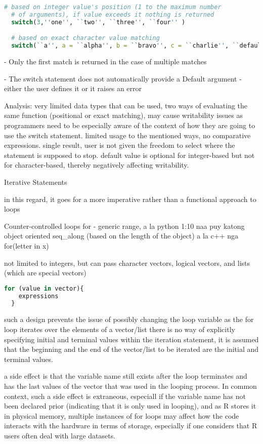 \documentclass[12pt]{article}
\begin{document}
\begin{lstlisting}[language=R]
  # based on integer value's position (1 to the maximum number
  # of arguments), if value exceeds it nothing is returned
  switch(3,''one'', ``two'', ``three'', ``four'' )

  # based on exact character value matching
  switch(``a'', a = ``alpha'', b = ``bravo'', c = ``charlie'', ``default value'')
\end{lstlisting}

- Only the first match is returned in the case of multiple matches

- The switch statement does not automatically provide a Default argument - either the user defines it or it raises an error

Analysis: very limited data types that can be used, two ways of evaluating the same function (positional or exact matching), may cause writability issues as programmers need to be especially aware of the context of how they are going to use the switch statement. limited usage to the mentioned ways, no comparative expressions. single result, user is not given the freedom to select where the statement is supposed to stop. default value is optional for integer-based but not for character-based, thereby negatively affecting writability.


Iterative Statements

in this regard, it goes for a more imperative rather than a functional approach to loops

Counter-controlled loops
for - generic
range, a la python 1:10
naa puy katong object oriented seq\_along (based on the length of the object)
a la c++ nga for(letter in x)

not limited to integers, but can pass character vectors, logical vectors, and lists (which are special vectors)

\begin{lstlisting}[language=R]
  for (value in vector){
    expressions
  }
\end{lstlisting}

such a design prevents the issue of possibly changing the loop variable as the for loop iterates over the elements of a vector/list
there is no way of explicitly specifying initial and terminal values within the iteration statement, it is assumed that the beginning and the end of the vector/list to be iterated are the initial and terminal values.

a side effect is that the variable name still exists after the loop terminates and has the last values of the vector that was used in the looping process. In common context, such a side effect is extraneous, especiall if the variable name has not been declared prior (indicating that it is only used in looping), and as R stores it in physical memory, multiple instances of for loops may affect how the code interacts with the hardware in terms of storage, especially if one considers that R users often deal with large datasets.
\end{document}
